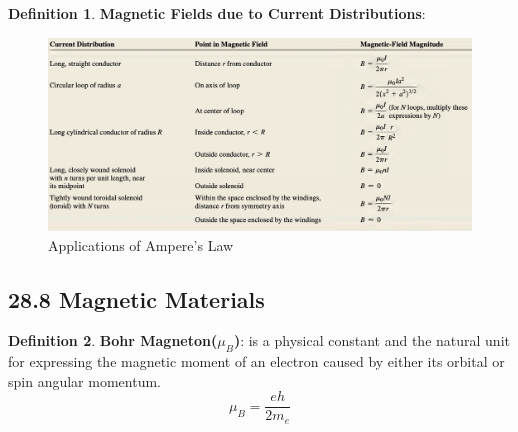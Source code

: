 \documentclass[12pt]{amsart}
\theoremstyle{definition}
\newtheorem{definition}{Definition} %
\numberwithin{equation}{theorem}    %
\begin{document}
\begin{definition}
    \textbf{Magnetic Fields due to Current Distributions}:
\end{definition}
\begin{figure}[H]
    \centering
    \includegraphics[width=6.5in]{Media/table.png}
    \caption{Applications of Ampere's Law}
    \label{Applications of Ampere's Law}
\end{figure} 

\subsection*{28.8 Magnetic Materials}


\begin{definition}
    \textbf{Bohr Magneton($\mu_B$)}:
    is a physical constant and the natural unit for expressing the magnetic moment of an electron caused by either its orbital or spin angular momentum.
    $$\mu_B = \frac{eh}{2m_e}$$
\end{definition}
\end{document}
